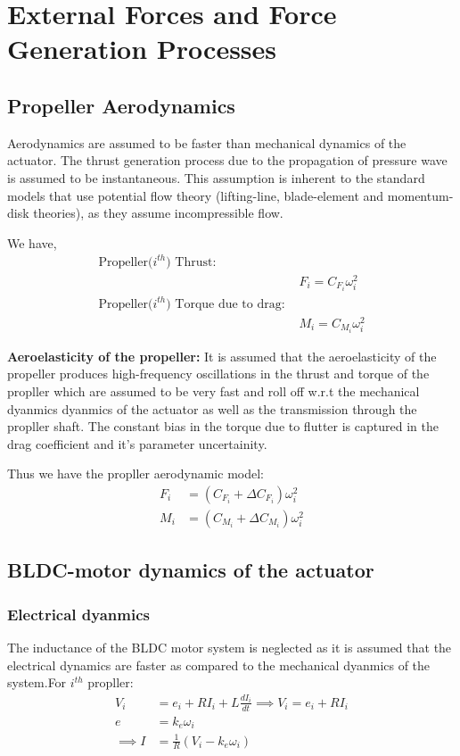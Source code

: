 \section{External Forces and Force Generation Processes}

\subsection{Propeller Aerodynamics}

Aerodynamics are assumed to be faster than mechanical dynamics of the actuator.
The thrust generation process due to the propagation of pressure wave is assumed to be instantaneous. This assumption is inherent to the standard models that use potential flow theory (lifting-line, blade-element and momentum-disk theories), as they assume incompressible flow.

We have,
\begin{align*}
    \text{Propeller($i^{th}$) Thrust: } &\\
    & F_i = C_{F_i} \omega_i^2\\
    \text{Propeller($i^{th}$) Torque due to drag: } &\\
    & M_i = C_{M_i} \omega_i^2
\end{align*}

\textbf{Aeroelasticity of the propeller:} It is assumed that the aeroelasticity of the propeller produces high-frequency oscillations in the thrust and torque of the propller which are assumed to be very fast and roll off w.r.t the mechanical dyanmics dyanmics of the actuator as well as the transmission through the propller shaft. The constant  bias in the torque due to flutter is captured in the drag coefficient and it's parameter uncertainity.

Thus we have the propller aerodynamic model:
\begin{align*}
    F_i &= (C_{F_i} + \Delta C_{F_i}) \omega_i^2\\
    M_i &= (C_{M_i} + \Delta C_{M_i}) \omega_i^2
\end{align*}


\subsection{BLDC-motor dynamics of the actuator}
\subsubsection{Electrical dyanmics}
The inductance of the BLDC motor system is neglected as it is assumed that the electrical dynamics are faster as compared to the mechanical dyanmics of the system.For $i^{th}$ propller:
\begin{align*}
    V_i &= e_i + RI_i + L \frac{dI_i}{dt} \implies V_i = e_i + RI_i\\
    e &= k_e \omega_i\\
    \implies I &= \frac{1}{R} \left( V_i - k_e \omega_i \right)
\end{align*}

